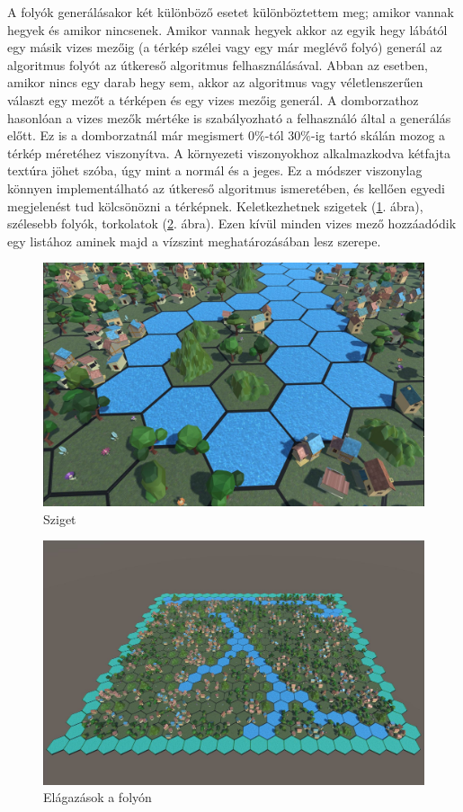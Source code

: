 
A folyók generálásakor két különböző esetet különböztettem meg; amikor vannak hegyek és amikor nincsenek. Amikor vannak hegyek akkor az egyik hegy lábától egy másik vizes mezőig (a térkép szélei vagy egy már meglévő folyó) generál az algoritmus folyót az útkereső algoritmus felhasználásával. Abban az esetben, amikor nincs egy darab hegy sem, akkor az algoritmus vagy véletlenszerűen választ egy mezőt a térképen és egy vizes mezőig generál. A domborzathoz hasonlóan a vizes mezők mértéke is szabályozható a felhasználó által a generálás előtt. Ez is a domborzatnál már megismert $0\%$-tól $30\%$-ig tartó skálán mozog a térkép méretéhez viszonyítva. A környezeti viszonyokhoz alkalmazkodva kétfajta textúra jöhet szóba, úgy mint a normál és a jeges. Ez a módszer viszonylag könnyen implementálható az útkereső algoritmus ismeretében, és kellően egyedi megjelenést tud kölcsönözni a térképnek. Keletkezhetnek szigetek (\ref{fig:Island}. ábra), szélesebb folyók, torkolatok (\ref{fig:Branch}. ábra). Ezen kívül minden vizes mező hozzáadódik egy listához aminek majd a vízszint meghatározásában lesz szerepe.

\begin{figure}[h!]
\centering
\includegraphics[scale=0.3]{kepek/Island.JPG}
\caption{Sziget}
\label{fig:Island}
\end{figure}

\begin{figure}[h!]
\centering
\includegraphics[scale=0.3]{kepek/Branch.JPG}
\caption{Elágazások a folyón}
\label{fig:Branch}
\end{figure}

